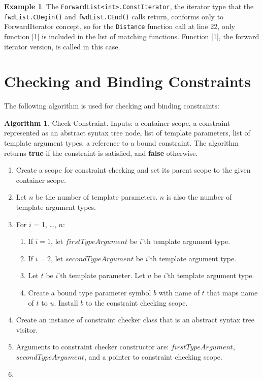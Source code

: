 \documentclass[a4paper,oneside,11pt]{book}
\theoremstyle{definition}
\newtheorem{exmp}{Example}[section]
\newtheorem{algo}{Algorithm}[section]
\begin{document}
\begin{exmp}
The \verb|ForwardList<int>.ConstIterator|, the iterator type that the \verb|fwdList.CBegin()| and \verb|fwdList.CEnd()| calls return, conforms only to ForwardIterator concept,
so for the \verb|Distance| function call at line 22, only function [1] is included in the list of matching functions.
Function [1], the forward iterator version, is called in this case.
\end{exmp}

\clearpage
\section{Checking and Binding Constraints}

The following algorithm is used for checking and binding constraints:

\begin{algo}\label{checkconstraints} Check Constraint. Inputs: a container scope, a constraint represented as an abstract syntax tree node,
list of template parameters, list of template argument types, a reference to a bound constraint.
The algorithm returns \textbf{true} if the constraint is satisfied, and \textbf{false} otherwise.
\begin{enumerate}
\item
Create a scope for constraint checking and set its parent scope to the given container scope.
\item
Let $n$ be the number of template parameters. $n$ is also the number of template argument types.
\item
For $i$ = 1, \ldots, $n$:
\begin{enumerate}
\item
If $i = 1$, let $firstTypeArgument$ be $i$'th template argument type.
\item
If $i = 2$, let $secondTypeArgument$ be $i$'th template argument type.
\item
Let $t$ be $i$'th template parameter. Let $u$ be $i$'th template argument type.
\item
Create a bound type parameter symbol $b$ with name of $t$ that maps name of $t$ to $u$. Install $b$ to the constraint checking scope.
\end{enumerate}
\item
Create an instance of constraint checker class that is an abstract syntax tree visitor.
\item
Arguments to constraint checker constructor are: $firstTypeArgument$, $secondTypeArgument$, and a pointer to constraint checking scope.
\item

\end{enumerate}
\end{algo}
\end{document}
